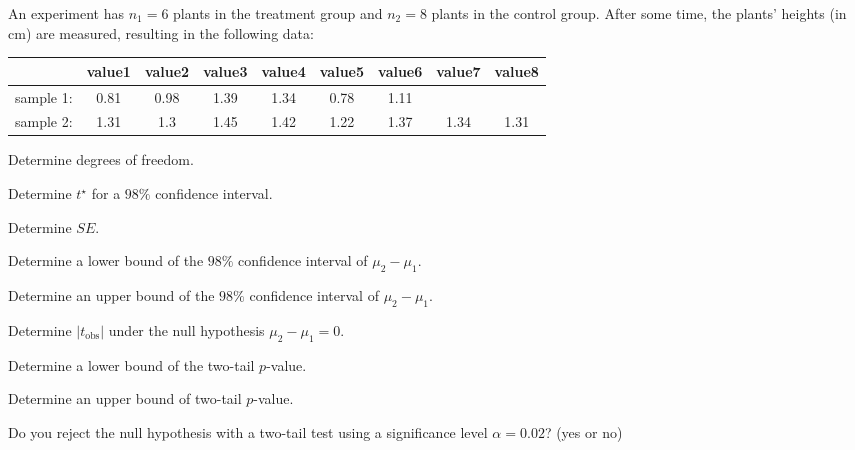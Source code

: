 
\begin{question}
An experiment has \(n_1 = 6\) plants in the treatment group and
\(n_2 = 8\) plants in the control group. After some time, the plants'
heights (in cm) are measured, resulting in the following data:

\begin{longtable}[]{@{}ccccccccc@{}}
\toprule
& value1 & value2 & value3 & value4 & value5 & value6 & value7 &
value8\tabularnewline
\midrule
\endhead
sample 1: & 0.81 & 0.98 & 1.39 & 1.34 & 0.78 & 1.11\tabularnewline
sample 2: & 1.31 & 1.3 & 1.45 & 1.42 & 1.22 & 1.37 & 1.34 &
1.31\tabularnewline
\bottomrule
\end{longtable}
\begin{answerlist}
  \item Determine degrees of freedom.
  \item Determine \(t^\star\) for a \(98\%\) confidence interval.
  \item Determine \(SE\).
  \item Determine a lower bound of the \(98\%\) confidence interval of
\(\mu_2-\mu_1\).
  \item Determine an upper bound of the \(98\%\) confidence interval of
\(\mu_2-\mu_1\).
  \item Determine \(|t_\text{obs}|\) under the null hypothesis
\(\mu_2-\mu_1=0\).
  \item Determine a lower bound of the two-tail \(p\)-value.
  \item Determine an upper bound of two-tail \(p\)-value.
  \item Do you reject the null hypothesis with a two-tail test using a
significance level \(\alpha = 0.02\)? (yes or no)
\end{answerlist}
\end{question}

